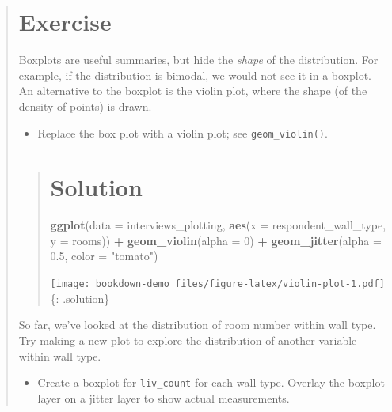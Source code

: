 \documentclass[]{book}
\newenvironment{Shaded}{\begin{snugshade}}{\end{snugshade}}
\newcommand{\KeywordTok}[1]{\textcolor[rgb]{0.13,0.29,0.53}{\textbf{#1}}}
\newcommand{\DataTypeTok}[1]{\textcolor[rgb]{0.13,0.29,0.53}{#1}}
\newcommand{\DecValTok}[1]{\textcolor[rgb]{0.00,0.00,0.81}{#1}}
\newcommand{\FloatTok}[1]{\textcolor[rgb]{0.00,0.00,0.81}{#1}}
\newcommand{\StringTok}[1]{\textcolor[rgb]{0.31,0.60,0.02}{#1}}
\newcommand{\OperatorTok}[1]{\textcolor[rgb]{0.81,0.36,0.00}{\textbf{#1}}}
\newcommand{\NormalTok}[1]{#1}
\providecommand{\tightlist}{%
  \setlength{\itemsep}{0pt}\setlength{\parskip}{0pt}}
\begin{document}
\begin{quote}
\section{Exercise}\label{exercise-13}

Boxplots are useful summaries, but hide the \emph{shape} of the
distribution. For example, if the distribution is bimodal, we would not
see it in a boxplot. An alternative to the boxplot is the violin plot,
where the shape (of the density of points) is drawn.

\begin{itemize}
\tightlist
\item
  Replace the box plot with a violin plot; see \texttt{geom\_violin()}.
\end{itemize}

\begin{quote}
\section{Solution}\label{solution-17}

\begin{Shaded}
\begin{Highlighting}[]
\KeywordTok{ggplot}\NormalTok{(}\DataTypeTok{data =}\NormalTok{ interviews_plotting, }\KeywordTok{aes}\NormalTok{(}\DataTypeTok{x =}\NormalTok{ respondent_wall_type, }\DataTypeTok{y =}\NormalTok{ rooms)) }\OperatorTok{+}
\StringTok{  }\KeywordTok{geom_violin}\NormalTok{(}\DataTypeTok{alpha =} \DecValTok{0}\NormalTok{) }\OperatorTok{+}
\StringTok{  }\KeywordTok{geom_jitter}\NormalTok{(}\DataTypeTok{alpha =} \FloatTok{0.5}\NormalTok{, }\DataTypeTok{color =} \StringTok{"tomato"}\NormalTok{)}
\end{Highlighting}
\end{Shaded}

\texttt{[image: bookdown-demo\_files/figure-latex/violin-plot-1.pdf]} \{:
.solution\}
\end{quote}

So far, we've looked at the distribution of room number within wall
type. Try making a new plot to explore the distribution of another
variable within wall type.

\begin{itemize}
\tightlist
\item
  Create a boxplot for \texttt{liv\_count} for each wall type. Overlay
  the boxplot layer on a jitter layer to show actual measurements.
\end{itemize}


\end{quote}
\end{document}
